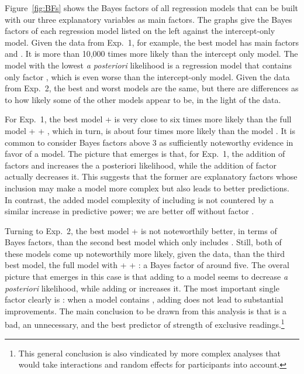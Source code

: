 \documentclass[12pt]{article}
\begin{document}
Figure~\ref{fig:BFs} shows the Bayes factors of all regression models that can be built with
our three explanatory variables as main factors. The graphs give the Bayes factors of each
regression model listed on the left against the intercept-only model. Given the data from
Exp.~1, for example, the best model has main factors \com and \pri. It is more than 10,000
times more likely than the intercept only model. The model with the lowest \emph{a posteriori}
likelihood is a regression model that contains only factor \rel, which is even worse than the
intercept-only model. Given the data from Exp.~2, the best and worst models are the same, but
there are differences as to how likely some of the other models appear to be, in the light of
the data.

For Exp.~1, the best model \com + \pri is very close to six times more likely than the full
model \rel + \com + \pri, which in turn, is about four times more likely than the model
\pri. It is common to consider Bayes factors above 3 as sufficiently noteworthy evidence in
favor of a model. The picture that emerges is that, for Exp.~1, the addition of factors \pri
and \com increases the a posteriori likelihood, while the addition of factor \rel actually
decreases it. This suggests that the former are explanatory factors whose inclusion may make a
model more complex but also leads to better predictions. In contrast, the added model
complexity of including \rel is not countered by a similar increase in predictive power; we are
better off without factor \rel.

Turning to Exp.~2, the best model \com + \pri is not noteworthily better, in terms of Bayes
factors, than the second best model which only includes \pri. Still, both of these models come
up noteworthily more likely, given the data, than the third best model, the full model with
\rel + \com + \pri: a Bayes factor of around five. The overal picture that emerges in this case
is that adding \rel to a model seems to decrease \emph{a posteriori} likelihood, while adding
\com or \pri increases it. The most important single factor clearly is \pri: when a model
contains \pri, adding \com does not lead to substantial improvements. The main conclusion to be
drawn from this analysis is that \rel is a bad, \com an unnecessary, and \pri the best
predictor of strength of exclusive readings.\footnote{This general conclusion is also
  vindicated by more complex analyses that would take interactions and random effects for
  participants into account.}
\end{document}
